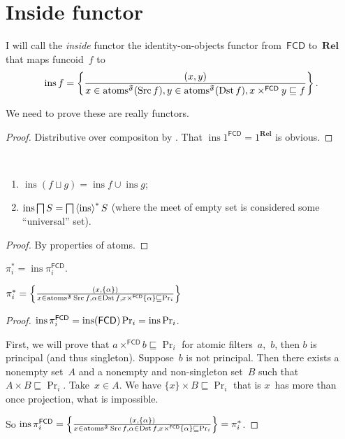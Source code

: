 \chapter{Inside functor}

\begin{defn}
I will call the \emph{inside} functor the identity-on-objects functor from~$\mathsf{FCD}$ to~$\mathbf{Rel}$ that maps
funcoid~$f$ to
\[
\operatorname{ins} f =
\left\{ \frac{(x,y)}{x\in\operatorname{atoms}^{\mathfrak{F}}(\operatorname{Src} f), y\in\operatorname{atoms}^{\mathfrak{F}}(\operatorname{Dst} f), x\times^{\mathsf{FCD}}y\sqsubseteq f}\right\}. \]
\end{defn}

We need to prove these are really functors.

\begin{proof}
Distributive over compositon by \cite[proposition~]{volume-1}.
That $\operatorname{ins} 1^{\mathsf{FCD}} = 1^{\mathbf{Rel}}$ is obvious.
\end{proof}

\begin{prop}
~
\begin{enumerate}
\item $\operatorname{ins}(f\sqcup g)=\operatorname{ins}f\cup\operatorname{ins}g$;
\item $\operatorname{ins}\bigsqcap S=\bigsqcap\left\langle \operatorname{ins}\right\rangle ^{\ast}S$ (where the meet of empty set is considered some ``universal'' set).
\end{enumerate}
\end{prop}

\begin{proof}
By properties of atoms.
\end{proof}

\begin{defn}
$\pi_i^{\ast}=\operatorname{ins}\pi^{\mathsf{FCD}}_i$.
\end{defn}

\begin{prop}
$\pi_i^{\ast}=
\left\{ \frac{(x,\{\alpha\})}{x\in\operatorname{atoms}^{\mathfrak{F}}\operatorname{Src} f,\alpha\in\operatorname{Dst} f, x\times^{\mathsf{FCD}}\{\alpha\}\sqsubseteq \Pr_i}\right\}$
\end{prop}

\begin{proof}
$\operatorname{ins}\pi^{\mathsf{FCD}}_i=\operatorname{ins}(\mathsf{FCD})\Pr_i=\operatorname{ins}\Pr_i$.

First, we will prove that 
$a\times^{\mathsf{FCD}}b\sqsubseteq\Pr_i$ for atomic filters~$a$,~$b$, then $b$ is principal (and thus singleton). 
Suppose~$b$ is not principal. Then there exists a nonempty set~$A$ and a nonempty and non-singleton set~$B$ such that $A\times B\sqsubseteq\Pr_i$. Take~$x\in A$. We have $\{x\}\times B\sqsubseteq\Pr_i$ that is $x$~has more than once projection, what is impossible.

So $\operatorname{ins}\pi^{\mathsf{FCD}}_i=
\left\{ \frac{(x,\{\alpha\})}{x\in\operatorname{atoms}^{\mathfrak{F}}\operatorname{Src} f,\alpha\in\operatorname{Dst} f, x\times^{\mathsf{FCD}}\{\alpha\}\sqsubseteq\Pr_i}\right\}=\pi_i^{\ast}$.
\end{proof}

